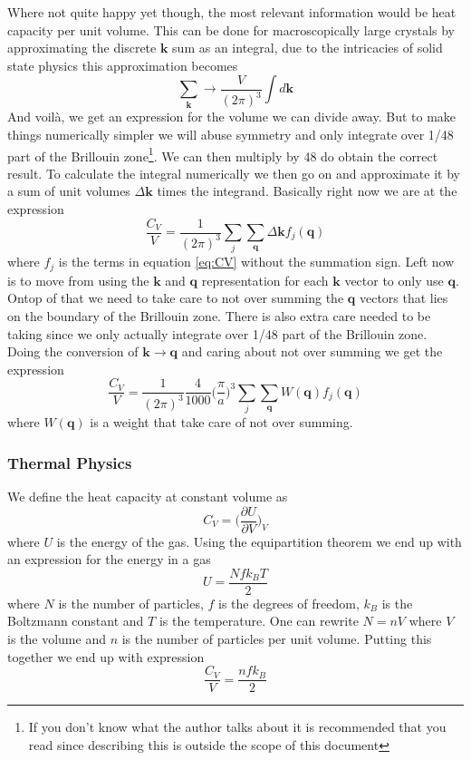 \documentclass[11pt]{article}
\begin{document}
Where not quite happy yet though, the most relevant information would be heat capacity per unit volume. This can be done for macroscopically large crystals by approximating the discrete $\mathbf{k}$ sum as an integral, due to the intricacies of solid state physics this approximation becomes
\begin{equation}
	\sum_\mathbf{k} \rightarrow \frac{V}{(2\pi)^3} \int d\mathbf{k}
\end{equation}
And voilà, we get an expression for the volume we can divide away. But to make things numerically simpler we will abuse symmetry and only integrate over 1/48 part of the Brillouin zone\footnote{If you don't know what the author talks about it is recommended that you read \cite{bib:solid} since describing this is outside the scope of this document}. We can then multiply by 48 do obtain the correct result. To calculate the integral numerically we then go on and approximate it by a sum of unit volumes $\Delta\mathbf{k}$ times the integrand. Basically right now we are at the expression
\begin{equation}
	\frac{C_V}{V} = \frac{1}{(2\pi)^3} \sum_j \sum_\mathbf{q} \Delta\mathbf{k} f_j(\mathbf{q})
\end{equation}
where $f_j$ is the terms in equation \ref{eq:CV} without the summation sign. Left now is to move from using the $\mathbf{k}$ and $\mathbf{q}$ representation for each $\mathbf{k}$ vector to only use $\mathbf{q}$. Ontop of that we need to take care to not over summing the $\mathbf{q}$ vectors that lies on the boundary of the Brillouin zone. There is also extra care needed to be taking since we only actually integrate over 1/48 part of the Brillouin zone. Doing the conversion of $\mathbf{k}\rightarrow\mathbf{q}$ and caring about not over summing we get the expression
\begin{equation}
	\frac{C_V}{V} = \frac{1}{(2\pi)^3} \frac{4}{1000} \big(\frac{\pi}{a})^3 \sum_j \sum_{\mathbf{q}} W(\mathbf{q})f_j(\mathbf{q}) 
\end{equation}
where $W(\mathbf{q})$ is a weight that take care of not over summing.
\subsubsection{Thermal Physics}
We define the heat capacity at constant volume as
\begin{equation}
	C_V = \Big(\frac{\partial U}{\partial V}\Big)_V
\end{equation}
where $U$ is the energy of the gas. Using the equipartition theorem we end up with an expression for the energy in a gas\cite{bib:thermo}
\begin{equation}
	U = \frac{Nfk_BT}{2}
\end{equation}
where $N$ is the number of particles, $f$ is the degrees of freedom, $k_B$ is the Boltzmann constant and $T$ is the temperature.  One can rewrite $N = nV$ where $V$ is the volume and $n$ is the number of particles per unit volume. Putting this together we end up with expression
\begin{equation}
	\frac{C_V}{V} = \frac{nfk_B}{2}
	\label{eq:thermoCvFirst}
\end{equation}
\end{document}
